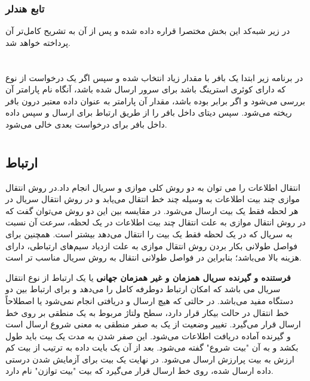 \subsubsection{تابع هندلر}
در زیر شبه‌کد این بخش مختصرا قراره داده شده و پس از آن به تشریح کامل‌تر آن پرداخته خواهد شد.
\section*{}
\begin{latin}
	
\end{latin}

در برنامه زیر ابتدا یک بافر
\noindent\unskip{}
با مقدار زیاد انتخاب شده و سپس اگر یک درخواست از نوع
که دارای کوئری استرینگ باشد برای سرور ارسال شده باشد، آنگاه نام پارامتر آن بررسی می‌شود و اگر برابر
بوده باشد، مقدار آن پارامتر به عنوان داده معتبر درون بافر ریخته می‌شود. سپس دیتای داخل بافر را از طریق ارتباط
برای
ارسال و سپس داده داخل بافر برای درخواست بعدی خالی می‌شود. 
\section*{}
\begin{latin}
	
\end{latin}

\subsection{ارتباط }
انتقال اطلاعات را می توان به دو روش کلی موازی و سریال انجام داد.در روش انتقال موازی چند بیت اطلاعات به وسیله چند خط انتقال می‌یابد و در روش انتقال سریال در هر لحظه فقط یک بیت ارسال می‌شود. در مقایسه بین این دو روش می‌توان گفت که در روش انتقال موازی به علت انتقال چند بیت اطلاعات در یک لحظه، سرعت آن نسبت به سریال که در یک لحظه فقط یک بیت را انتقال می‌دهد بیشتر است. همچنین برای فواصل طولانی بکار بردن روش انتقال موازی به علت ازدیاد سیم‌های ارتباطی، دارای هزینه بالا می‌باشد؛ بنابراین در فواصل طولانی انتقال به روش سریال مناسب تر است.

\textbf{فرستنده و گیرنده سریال همزمان و غیر همزمان جهانی} یا  یک ارتباط از نوع انتقال سریال می باشد که امکان ارتباط دوطرفه کامل را می‌دهد و برای ارتباط بین دو دستگاه مفید می‌باشد.
در حالتی که هیچ ارسال و دریافتی انجام نمی‌شود یا اصطلاحاً خط انتقال در حالت بیکار  قرار دارد، سطح ولتاژ مربوط به یک منطقی بر روی خط ارسال قرار می‌گیرد. تغییر وضعیت از یک به صفر منطقی به معنی شروع ارسال است و گیرنده آماده دریافت اطلاعات می‌شود. این صفر شدن به مدت یک بیت باید طول بکشد و به آن "بیت شروع" گفته می‌شود. بعد از آن یک بایت داده به ترتیب از بیت کم ارزش  به بیت پرارزش  ارسال می‌شود. در نهایت یک بیت برای آزمایش شدن درستی داده ارسال شده، روی خط ارسال قرار می‌گیرد که بیت "بیت توازن" نام دارد.

